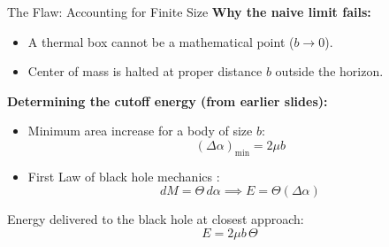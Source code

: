 \documentclass[aspectratio=169]{beamer}
\begin{document}
\begin{frame}{The Flaw: Accounting for Finite Size}
\textbf{Why the naive limit fails:}
\begin{itemize}
    \item A thermal box cannot be a mathematical point ($b \to 0$).
    \item Center of mass is halted at proper distance $b$ outside the horizon.
\end{itemize}

\vspace{0.3cm}
\textbf{Determining the cutoff energy (from earlier slides):}
\begin{itemize}
    \item Minimum area increase for a body of size $b$:
    \[
    (\Delta\alpha)_{\min} = 2\mu b
    \]
    \item First Law of black hole mechanics :
    \[
    dM = \Theta\,d\alpha \implies E = \Theta(\Delta\alpha)
    \]
\end{itemize}

\vspace{0.2cm}
Energy delivered to the black hole at closest approach:
\[
\boxed{E = 2\mu b\,\Theta}
\]
\end{frame}



\end{document}
